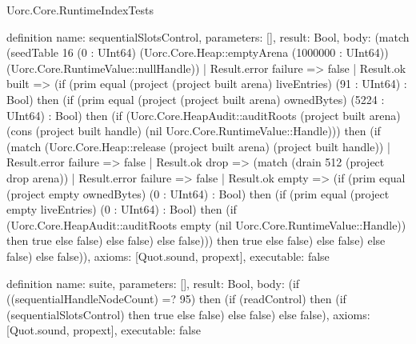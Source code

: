 \begin{lexlean}{Uorc.Core.RuntimeIndexTests}
\begin{semanticmodule}
definition{
  name: sequentialSlotsControl,
  parameters: [],
  result: Bool,
  body: (match (seedTable 16 (0 : UInt64) (Uorc.Core.Heap::emptyArena (1000000 : UInt64)) (Uorc.Core.RuntimeValue::nullHandle))
    | Result.error failure => false
    | Result.ok built => (if (prim equal (project (project built arena) liveEntries) (91 : UInt64) : Bool) then (if (prim equal (project (project built arena) ownedBytes) (5224 : UInt64) : Bool) then (if (Uorc.Core.HeapAudit::auditRoots (project built arena) (cons (project built handle) (nil Uorc.Core.RuntimeValue::Handle))) then (if (match (Uorc.Core.Heap::release (project built arena) (project built handle))
      | Result.error failure => false
      | Result.ok drop => (match (drain 512 (project drop arena))
        | Result.error failure => false
        | Result.ok empty => (if (prim equal (project empty ownedBytes) (0 : UInt64) : Bool) then (if (prim equal (project empty liveEntries) (0 : UInt64) : Bool) then (if (Uorc.Core.HeapAudit::auditRoots empty (nil Uorc.Core.RuntimeValue::Handle)) then true else false) else false) else false))) then true else false) else false) else false) else false)),
  axioms: [Quot.sound, propext],
  executable: false
}

definition{
  name: suite,
  parameters: [],
  result: Bool,
  body: (if ((sequentialHandleNodeCount) =? 95) then (if (readControl) then (if (sequentialSlotsControl) then true else false) else false) else false),
  axioms: [Quot.sound, propext],
  executable: false
}
\end{semanticmodule}
\end{lexlean}
